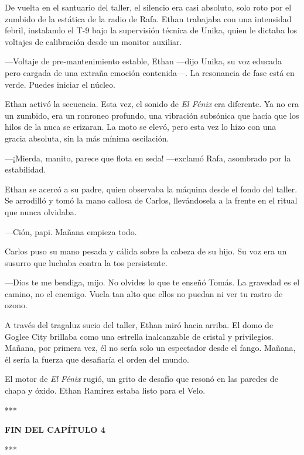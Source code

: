 \documentclass[11pt,twoside]{book}
\begin{document}
De vuelta en el santuario del taller, el silencio era casi absoluto, solo roto por el zumbido de la estática de la radio de Rafa. Ethan trabajaba con una intensidad febril, instalando el T-9 bajo la supervisión técnica de Unika, quien le dictaba los voltajes de calibración desde un monitor auxiliar.

---Voltaje de pre-mantenimiento estable, Ethan ---dijo Unika, su voz educada pero cargada de una extraña emoción contenida---. La resonancia de fase está en verde. Puedes iniciar el núcleo.

Ethan activó la secuencia. Esta vez, el sonido de \textit{El Fénix} era diferente. Ya no era un zumbido, era un ronroneo profundo, una vibración subsónica que hacía que los hilos de la nuca se erizaran. La moto se elevó, pero esta vez lo hizo con una gracia absoluta, sin la más mínima oscilación.

---¡Mierda, manito, parece que flota en seda! ---exclamó Rafa, asombrado por la estabilidad.

Ethan se acercó a su padre, quien observaba la máquina desde el fondo del taller. Se arrodilló y tomó la mano callosa de Carlos, llevándosela a la frente en el ritual que nunca olvidaba.

---Ción, papi. Mañana empieza todo.

Carlos puso su mano pesada y cálida sobre la cabeza de su hijo. Su voz era un susurro que luchaba contra la tos persistente.

---Dios te me bendiga, mijo. No olvides lo que te enseñó Tomás. La gravedad es el camino, no el enemigo. Vuela tan alto que ellos no puedan ni ver tu rastro de ozono.

A través del tragaluz sucio del taller, Ethan miró hacia arriba. El domo de Goglee City brillaba como una estrella inalcanzable de cristal y privilegios. Mañana, por primera vez, él no sería solo un espectador desde el fango. Mañana, él sería la fuerza que desafiaría el orden del mundo.

El motor de \textit{El Fénix} rugió, un grito de desafío que resonó en las paredes de chapa y óxido. Ethan Ramírez estaba listo para el Velo.

\bigskip
\begin{center}***\end{center}
\bigskip

\textbf{FIN DEL CAPÍTULO 4}


\bigskip
\begin{center}***\end{center}
\bigskip
\end{document}
